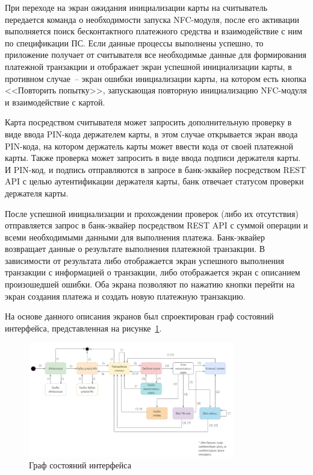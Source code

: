При переходе на экран ожидания инициализации карты на считыватель передается команда о необходимости запуска NFC-модуля, после его активации выполняется поиск бесконтактного платежного средства и взаимодействие с ним по спецификации ПС.
Если данные процессы выполнены успешно, то приложение получает от считывателя все необходимые данные для формирования платежной транзакции и отображает экран успешной инициализации карты, в противном случае~-- экран ошибки инициализации карты, на котором есть кнопка <<Повторить попытку>>, запускающая повторную инициализацию NFC-модуля и взаимодействие с картой.

Карта посредством считывателя может запросить дополнительную проверку в виде ввода PIN-кода держателем карты, в этом случае открывается экран ввода PIN-кода, на котором держатель карты может ввести кода от своей платежной карты.
Также проверка может запросить в виде ввода подписи держателя карты.
И PIN-код, и подпись отправляются в запросе в банк-эквайер посредством REST API с целью аутентификации держателя карты, банк отвечает статусом проверки держателя карты.

После успешной инициализации и прохождении проверок (либо их отсутствия) отправляется запрос в банк-эквайер посредством REST API с суммой операции и всеми необходимыми данными для выполнения платежа.
Банк-эквайер возвращает данные о результате выполнения платежной транзакции.
В зависимости от результата либо отображается экран успешного выполнения транзакции с информацией о транзакции, либо отображается экран с описанием произошедшей ошибки.
Оба экрана позволяют по нажатию кнопки перейти на экран создания платежа и создать новую платежную транзакцию.


На основе данного описания экранов был спроектирован граф состояний интерфейса, представленная на рисунке~\ref{fig:nav}.

\begin{figure}[H]
    \centering
    \includegraphics[width=0.8\textwidth]{images/design/nav}
    \caption{\centering Граф состояний интерфейса}
    \label{fig:nav}
\end{figure}

